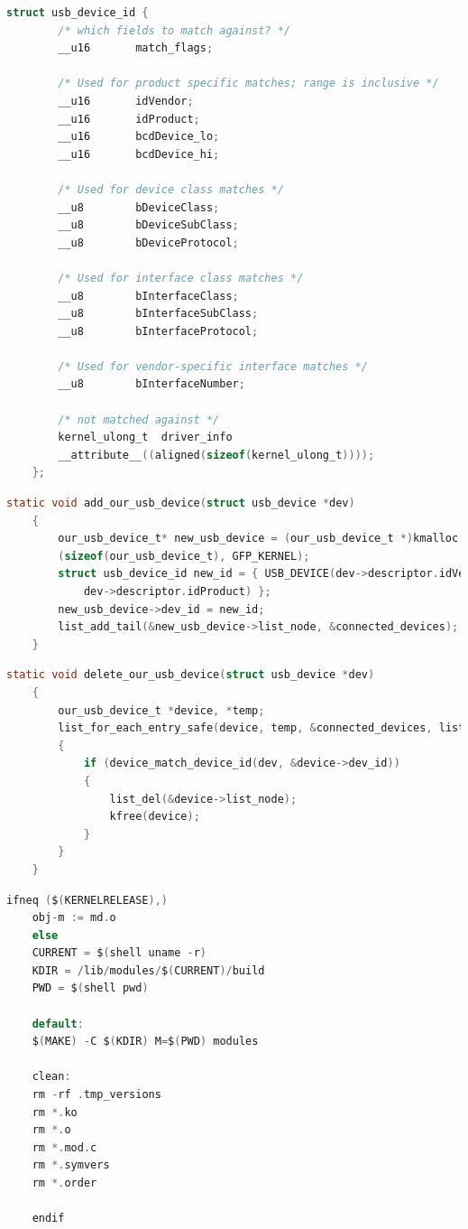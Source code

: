 \documentclass[a4paper, 10pt]{article}
\begin{document}
\begin{lstlisting}[language=C, caption = Структура usb\_device\_id, label =  lst:usb_device_id]
	struct usb_device_id {
		/* which fields to match against? */
		__u16		match_flags;
		
		/* Used for product specific matches; range is inclusive */
		__u16		idVendor;
		__u16		idProduct;
		__u16		bcdDevice_lo;
		__u16		bcdDevice_hi;
		
		/* Used for device class matches */
		__u8		bDeviceClass;
		__u8		bDeviceSubClass;
		__u8		bDeviceProtocol;
		
		/* Used for interface class matches */
		__u8		bInterfaceClass;
		__u8		bInterfaceSubClass;
		__u8		bInterfaceProtocol;
		
		/* Used for vendor-specific interface matches */
		__u8		bInterfaceNumber;
		
		/* not matched against */
		kernel_ulong_t	driver_info
		__attribute__((aligned(sizeof(kernel_ulong_t))));
	};
\end{lstlisting}

\begin{lstlisting}[language=C, caption = Добавление usb устройства, label =  lst:add_usb]
	static void add_our_usb_device(struct usb_device *dev)
	{
		our_usb_device_t* new_usb_device = (our_usb_device_t *)kmalloc
		(sizeof(our_usb_device_t), GFP_KERNEL);
		struct usb_device_id new_id = { USB_DEVICE(dev->descriptor.idVendor, 
			dev->descriptor.idProduct) };
		new_usb_device->dev_id = new_id;
		list_add_tail(&new_usb_device->list_node, &connected_devices);
	}
\end{lstlisting}

\begin{lstlisting}[language=C, caption = Удаление usb устройства, label =  lst:del_usb]
	static void delete_our_usb_device(struct usb_device *dev)
	{
		our_usb_device_t *device, *temp;
		list_for_each_entry_safe(device, temp, &connected_devices, list_node) 
		{
			if (device_match_device_id(dev, &device->dev_id))
			{
				list_del(&device->list_node);
				kfree(device);
			}
		}
	}
\end{lstlisting}

\begin{lstlisting}[language=C, caption = Makefile, label =  lst:makefile]
	ifneq ($(KERNELRELEASE),)
	obj-m := md.o
	else
	CURRENT = $(shell uname -r)
	KDIR = /lib/modules/$(CURRENT)/build
	PWD = $(shell pwd)
	
	default:
	$(MAKE) -C $(KDIR) M=$(PWD) modules
	
	clean:
	rm -rf .tmp_versions
	rm *.ko
	rm *.o
	rm *.mod.c
	rm *.symvers
	rm *.order
	
	endif
\end{lstlisting}
\end{document}
